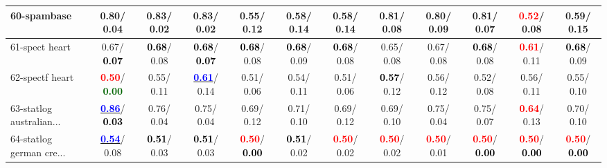 \begin{table}[h]
\begin{center}
{\begin{tabular}{lc|c|c|c|c|c|c|c|c|c|c}
60-spambase &   0.80/  0.04 &   0.83/  0.02 &   0.83/  0.02 &   0.55/  0.12 &   0.58/  0.14 &   0.58/  0.14 &   0.81/  0.08 &   0.80/  0.09 &   0.81/  0.07 & \textcolor{red}{\textbf{  0.52}}/  0.08 &   0.59/  0.15 \\ \hline
61-spect heart &   0.67/\textcolor{black}{\textbf{  0.07}} & \textcolor{black}{\textbf{  0.68}}/  0.08 & \textcolor{black}{\textbf{  0.68}}/\textcolor{black}{\textbf{  0.07}} & \textcolor{black}{\textbf{  0.68}}/  0.08 & \textcolor{black}{\textbf{  0.68}}/  0.09 & \textcolor{black}{\textbf{  0.68}}/  0.08 &   0.65/  0.08 &   0.67/  0.08 & \textcolor{black}{\textbf{  0.68}}/  0.08 & \textcolor{red}{\textbf{  0.61}}/  0.11 & \textcolor{black}{\textbf{  0.68}}/  0.09 \\
62-spectf heart & \textcolor{red}{\textbf{  0.50}}/\textcolor{darkgreen}{\textbf{  0.00}} &   0.55/  0.11 & \underline{\textcolor{blue}{\textbf{  0.61}}}/  0.14 &   0.51/  0.06 &   0.54/  0.11 &   0.51/  0.06 & \textcolor{black}{\textbf{  0.57}}/  0.12 &   0.56/  0.12 &   0.52/  0.08 &   0.56/  0.11 &   0.55/  0.10 \\
63-statlog australian... & \underline{\textcolor{blue}{\textbf{  0.86}}}/\textcolor{black}{\textbf{  0.03}} &   0.76/  0.04 &   0.75/  0.04 &   0.69/  0.12 &   0.71/  0.10 &   0.69/  0.12 &   0.69/  0.10 &   0.75/  0.04 &   0.75/  0.07 & \textcolor{red}{\textbf{  0.64}}/  0.13 &   0.70/  0.10 \\
64-statlog german cre... & \underline{\textcolor{blue}{\textbf{  0.54}}}/  0.08 & \textcolor{black}{\textbf{  0.51}}/  0.03 & \textcolor{black}{\textbf{  0.51}}/  0.03 & \textcolor{red}{\textbf{  0.50}}/\textcolor{black}{\textbf{  0.00}} & \textcolor{black}{\textbf{  0.51}}/  0.02 & \textcolor{red}{\textbf{  0.50}}/  0.02 & \textcolor{red}{\textbf{  0.50}}/  0.02 & \textcolor{red}{\textbf{  0.50}}/  0.01 & \textcolor{red}{\textbf{  0.50}}/\textcolor{black}{\textbf{  0.00}} & \textcolor{red}{\textbf{  0.50}}/\textcolor{black}{\textbf{  0.00}} & \textcolor{red}{\textbf{  0.50}}/\textcolor{black}{\textbf{  0.00}} \\\end{tabular}}\label{stratsBalAcc1aVFDT}
\end{center}
\end{table}
